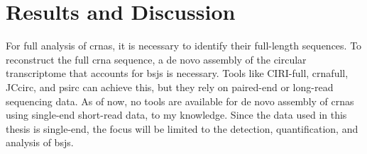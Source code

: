 \chapter{Results and Discussion}

For full analysis of \glspl{crna}, it is necessary to identify their
full-length sequences.
To reconstruct the full \gls{crna} sequence, a de novo assembly of the circular
transcriptome that accounts for \glspl{bsj} is necessary.
Tools like CIRI-full, \gls{crna}full, JCcirc, and psirc can achieve this, but
they rely on paired-end or long-read sequencing data.
As of now, no tools are available for de novo assembly of \glspl{crna} using
single-end short-read data, to my knowledge.
Since the data used in this thesis is single-end, the focus will be limited to
the detection, quantification, and analysis of \glspl{bsj}.





